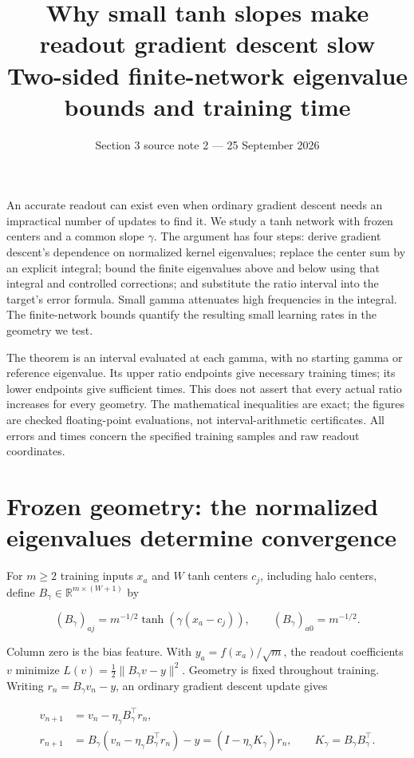 \documentclass[11pt]{article}
\title{Why small tanh slopes make readout gradient descent slow\\[4pt]\large Two-sided finite-network eigenvalue bounds and training time}
\author{}\date{Section 3 source note 2 --- 25 September 2026}
\begin{document}
\maketitle
An accurate readout can exist even when ordinary gradient descent needs an impractical number of updates to find it. We study a tanh network with frozen centers and a common slope \(\gamma\). The argument has four steps: derive gradient descent's dependence on normalized kernel eigenvalues; replace the center sum by an explicit integral; bound the finite eigenvalues above and below using that integral and controlled corrections; and substitute the ratio interval into the target's error formula. Small gamma attenuates high frequencies in the integral. The finite-network bounds quantify the resulting small learning rates in the geometry we test.

The theorem is an interval evaluated at each gamma, with no starting gamma or reference eigenvalue. Its upper ratio endpoints give necessary training times; its lower endpoints give sufficient times. This does not assert that every actual ratio increases for every geometry. The mathematical inequalities are exact; the figures are checked floating-point evaluations, not interval-arithmetic certificates. All errors and times concern the specified training samples and raw readout coordinates.

\section{Frozen geometry: the normalized eigenvalues determine convergence}

For \(m\ge2\) training inputs \(x_a\) and \(W\) tanh centers \(c_j\), including halo centers, define \(B_\gamma\in\mathbb R^{m\times(W+1)}\) by

\[
(B_\gamma)_{aj}=m^{-1/2}\tanh(\gamma(x_a-c_j)),
\qquad (B_\gamma)_{a0}=m^{-1/2}.
\]

Column zero is the bias feature. With \(y_a=f(x_a)/\sqrt m\), the readout coefficients \(v\) minimize \(L(v)=\tfrac12\|B_\gamma v-y\|^2\). Geometry is fixed throughout training. Writing \(r_n=B_\gamma v_n-y\), an ordinary gradient descent update gives

\[
\begin{aligned}
v_{n+1}&=v_n-\eta_\gamma B_\gamma^\top r_n,\\
r_{n+1}&=B_\gamma(v_n-\eta_\gamma B_\gamma^\top r_n)-y
=(I-\eta_\gamma K_\gamma)r_n,
\qquad K_\gamma=B_\gamma B_\gamma^\top.
\end{aligned}
\tag{1}
\]
\end{document}
